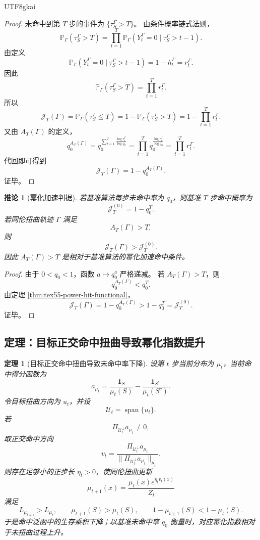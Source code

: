 \documentclass[12pt]{article}
\newtheorem{theorem}{定理}[section]
\newtheorem{corollary}{推论}[section]
\begin{document}
\begin{CJK*}{UTF8}{gkai}
\begin{proof}
未命中到第 \(T\) 步的事件为 \(\{\tau_S^\Gamma>T\}\)。
由条件概率链式法则，
\[
  \mathbb P_\Gamma(\tau_S^\Gamma>T)
  =
  \prod_{t=1}^{T}
  \mathbb P_\Gamma
  \left(
  Y_t^\Gamma=0
  \mid
  \tau_S^\Gamma>t-1
  \right).
\]
由定义
\[
  \mathbb P_\Gamma
  \left(
  Y_t^\Gamma=0
  \mid
  \tau_S^\Gamma>t-1
  \right)
  =
  1-h_t^\Gamma
  =
  r_t^\Gamma.
\]
因此
\[
  \mathbb P_\Gamma(\tau_S^\Gamma>T)
  =
  \prod_{t=1}^{T}r_t^\Gamma.
\]
所以
\[
  \mathcal J_T(\Gamma)
  =
  \mathbb P_\Gamma(\tau_S^\Gamma\le T)
  =
  1-\mathbb P_\Gamma(\tau_S^\Gamma>T)
  =
  1-\prod_{t=1}^{T}r_t^\Gamma.
\]
又由 \(A_T(\Gamma)\) 的定义，
\[
  q_0^{A_T(\Gamma)}
  =
  q_0^{
  \sum_{t=1}^{T}
  \frac{\log r_t^\Gamma}{\log q_0}
  }
  =
  \prod_{t=1}^{T}
  q_0^{\frac{\log r_t^\Gamma}{\log q_0}}
  =
  \prod_{t=1}^{T}r_t^\Gamma.
\]
代回即可得到
\[
  \mathcal J_T(\Gamma)=1-q_0^{A_T(\Gamma)}.
\]
证毕。
\end{proof}

\begin{corollary}[幂化加速判据]
\label{cor:tex55-power-acceleration-criterion}
若基准算法每步未命中率为 \(q_0\)，则基准 \(T\) 步命中概率为
\[
  \mathcal J_T^{(0)}
  =
  1-q_0^T.
\]
若同伦扭曲轨迹 \(\Gamma\) 满足
\[
  A_T(\Gamma)>T,
\]
则
\[
  \mathcal J_T(\Gamma)
  >
  \mathcal J_T^{(0)}.
\]
因此 \(A_T(\Gamma)>T\) 是相对于基准算法的幂化加速命中条件。
\end{corollary}

\begin{proof}
由于 \(0<q_0<1\)，函数 \(a\mapsto q_0^a\) 严格递减。
若 \(A_T(\Gamma)>T\)，则
\[
  q_0^{A_T(\Gamma)}<q_0^T.
\]
由定理 \ref{thm:tex55-power-hit-functional}，
\[
  \mathcal J_T(\Gamma)
  =
  1-q_0^{A_T(\Gamma)}
  >
  1-q_0^T
  =
  \mathcal J_T^{(0)}.
\]
证毕。
\end{proof}

\subsection{定理：目标正交命中扭曲导致幂化指数提升}
\label{subsec:tex55-orthogonal-power-improvement}

\begin{theorem}[目标正交命中扭曲导致未命中率下降]
\label{thm:tex55-orthogonal-power-improvement}
设第 \(t\) 步当前分布为 \(\mu_t\)，当前命中得分函数为
\[
  a_{\mu_t}
  =
  \frac{\mathbf 1_S}{\mu_t(S)}
  -
  \frac{\mathbf 1_{S^c}}{\mu_t(S^c)}.
\]
令目标扭曲方向为 \(u_t\)，并设
\[
  \mathcal U_t=\operatorname{span}\{u_t\}.
\]
若
\[
  \Pi_{\mathcal U_t^\perp}a_{\mu_t}\neq0,
\]
取正交命中方向
\[
  v_t
  =
  \frac{
  \Pi_{\mathcal U_t^\perp}a_{\mu_t}
  }{
  \lVert\Pi_{\mathcal U_t^\perp}a_{\mu_t}\rVert_{\mu_t}
  }.
\]
则存在足够小的正步长 \(\eta_t>0\)，使同伦扭曲更新
\[
  \mu_{t+1}(x)
  =
  \frac{
  \mu_t(x)e^{\eta_t v_t(x)}
  }{
  Z_t
  }
\]
满足
\[
  L_{\mu_{t+1}}>L_{\mu_t},
  \qquad
  \mu_{t+1}(S)>\mu_t(S),
  \qquad
  1-\mu_{t+1}(S)<1-\mu_t(S).
\]
于是命中泛函中的生存乘积下降；以基准未命中率 \(q_0\) 衡量时，对应幂化指数相对于未扭曲过程上升。
\end{theorem}


\end{CJK*}
\end{document}
